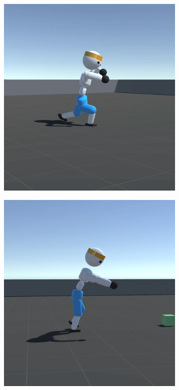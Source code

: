 \begin{figure}[H]
\begin{subfigure}{.3\textwidth}
  \end{subfigure}
  \begin{subfigure}{.3\textwidth}
    \centering
    \includegraphics[width=\textwidth]{img/charakter_walker_3}
  \end{subfigure}
  \begin{subfigure}{.3\textwidth}
    \centering
    \includegraphics[width=\textwidth]{img/charakter_walker_4}

\end{subfigure}
\end{figure}
